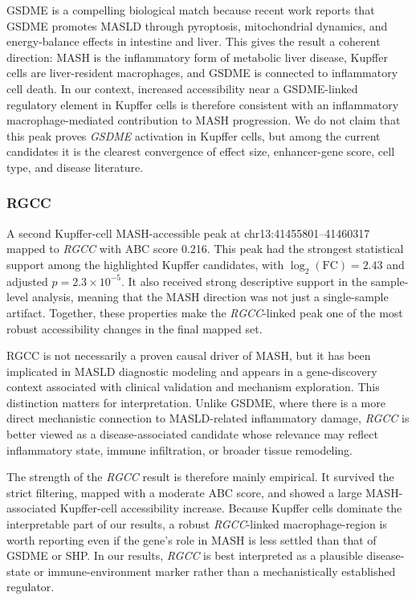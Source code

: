 \documentclass[11pt]{article}
\begin{document}
  GSDME is a compelling biological match because recent work reports that GSDME promotes MASLD through pyroptosis, mitochondrial dynamics, and energy-balance effects in intestine and liver\cite{Zhu2024GSDME}.
  This gives the result a coherent direction: MASH is the inflammatory form of metabolic liver disease, Kupffer cells are liver-resident macrophages, and GSDME is connected to inflammatory cell death.
  In our context, increased accessibility near a GSDME-linked regulatory element in Kupffer cells is therefore consistent with an inflammatory macrophage-mediated contribution to MASH progression.
  We do not claim that this peak proves \textit{GSDME} activation in Kupffer cells, but among the current candidates it is the clearest convergence of effect size, enhancer-gene score, cell type, and disease literature.

  \subsubsection{RGCC}
  A second Kupffer-cell MASH-accessible peak at chr13:41455801--41460317 mapped to \textit{RGCC} with ABC score 0.216.
  This peak had the strongest statistical support among the highlighted Kupffer candidates, with $\log_2(\mathrm{FC}) = 2.43$ and adjusted $p = 2.3 \times 10^{-5}$.
  It also received strong descriptive support in the sample-level analysis, meaning that the MASH direction was not just a single-sample artifact.
  Together, these properties make the \textit{RGCC}-linked peak one of the most robust accessibility changes in the final mapped set.

  RGCC is not necessarily a proven causal driver of MASH, but it has been implicated in MASLD diagnostic modeling and appears in a gene-discovery context associated with clinical validation and mechanism exploration\cite{Wang2024RGCC}.
  This distinction matters for interpretation.
  Unlike GSDME, where there is a more direct mechanistic connection to MASLD-related inflammatory damage, \textit{RGCC} is better viewed as a disease-associated candidate whose relevance may reflect inflammatory state, immune infiltration, or broader tissue remodeling.

  The strength of the \textit{RGCC} result is therefore mainly empirical.
  It survived the strict filtering, mapped with a moderate ABC score, and showed a large MASH-associated Kupffer-cell accessibility increase.
  Because Kupffer cells dominate the interpretable part of our results, a robust \textit{RGCC}-linked macrophage-region is worth reporting even if the gene's role in MASH is less settled than that of GSDME or SHP.
  In our results, \textit{RGCC} is best interpreted as a plausible disease-state or immune-environment marker rather than a mechanistically established regulator.
\end{document}
